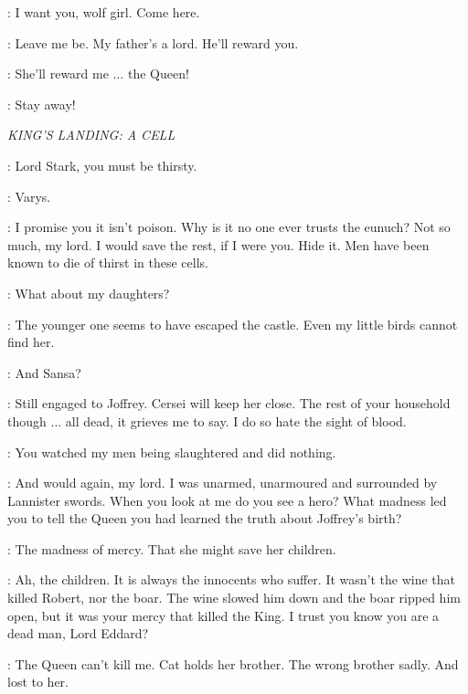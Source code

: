 \BOY: I want you, wolf girl. Come here. 

\ARYA: Leave me be. My father's a lord. He'll reward you. 

\BOY: She'll reward me $\ldots$ the Queen! 

\ARYA: Stay away! 



\scene

\textit{KING'S LANDING: A CELL} 


\VARYS: Lord Stark, you must be thirsty. 

\NED: Varys. 


\VARYS: I promise you it isn't poison. Why is it no one ever trusts the eunuch?
 Not so much, my lord. I would save the rest, if I were you. Hide it. Men have been known to die of thirst in these cells. 

\NED: What about my daughters? 

\VARYS: The younger one seems to have escaped the castle. Even my little birds cannot find her. 

\NED: And Sansa? 

\VARYS: Still engaged to Joffrey. Cersei will keep her close. The rest of your household though $\ldots$ all dead, it grieves me to say. I do so hate the sight of blood. 

\NED: You watched my men being slaughtered and did nothing. 

\VARYS: And would again, my lord. I was unarmed, unarmoured and surrounded by Lannister swords. When you look at me do you see a hero? What madness led you to tell the Queen you had learned the truth about Joffrey's birth? 

\NED: The madness of mercy. That she might save her children. 

\VARYS: Ah, the children. It is always the innocents who suffer. It wasn't the wine that killed Robert, nor the boar. The wine slowed him down and the boar ripped him open, but it was your mercy that killed the King. I trust you know you are a dead man, Lord Eddard? 

\NED: The Queen can't kill me. Cat holds her brother. The wrong brother sadly. And lost to her. 

